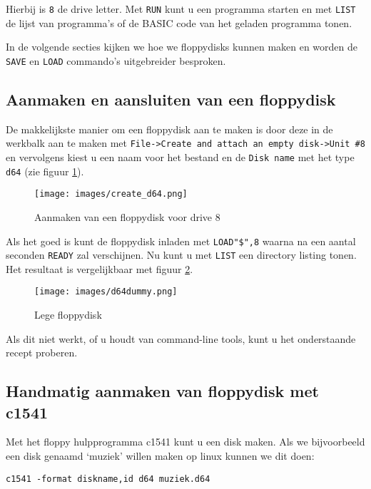 Hierbij is \verb:8: de drive letter.
Met \verb:RUN: kunt u een programma starten en met \verb:LIST: de lijst van programma's of de BASIC code van het geladen programma tonen.

In de volgende secties kijken we hoe we floppydisks kunnen maken en worden de \verb:SAVE: en \verb:LOAD: commando's uitgebreider besproken.

\subsection{Aanmaken en aansluiten van een floppydisk}

De makkelijkste manier om een floppydisk aan te maken is door deze in de werkbalk aan te maken met \verb:File->Create and attach an empty disk->Unit #8: en
vervolgens kiest u een naam voor het bestand en de \verb:Disk name: met het type \verb:d64: (zie figuur \ref{fig:create_d64}).

\begin{figure}
\centering
\texttt{[image: images/create\_d64.png]}
\caption{Aanmaken van een floppydisk voor drive 8}
\label{fig:create_d64}
\end{figure}

Als het goed is kunt de floppydisk inladen met \verb:LOAD"$",8: waarna na een aantal seconden \verb:READY: zal verschijnen.
Nu kunt u met \verb:LIST: een directory listing tonen.
Het resultaat is vergelijkbaar met figuur \ref{fig:d64dummy}.

\begin{figure}
\centering
\texttt{[image: images/d64dummy.png]}
\caption{Lege floppydisk}
\label{fig:d64dummy}
\end{figure}

Als dit niet werkt, of u houdt van command-line tools, kunt u het onderstaande recept proberen.

\subsection{Handmatig aanmaken van floppydisk met c1541}

Met het floppy hulpprogramma c1541 kunt u een disk maken.
Als we bijvoorbeeld een disk genaamd `muziek' willen maken op linux kunnen we dit doen:

\begin{lstlisting}
c1541 -format diskname,id d64 muziek.d64
\end{lstlisting}

